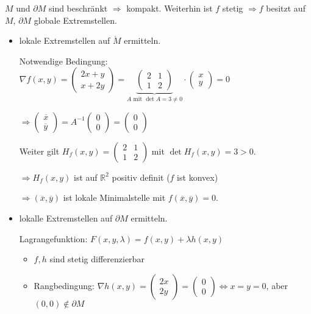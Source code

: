 \documentclass{scrreprt}
\begin{document}
$M$ und $\partial M$ sind beschränkt $\Rightarrow$ kompakt.
Weiterhin ist $f$ stetig $\Rightarrow f$ besitzt auf $M$, $\partial M$
globale Extremstellen.
\begin{itemize}
\item lokale Extremstellen auf $\mathring{M}$ ermitteln.

  Notwendige Bedingung: $\nabla f(x, y) = \begin{pmatrix}
    2x + y \\
    x + 2y
  \end{pmatrix} = \underset{A \text{ mit } \det A = 3 \ne 0}{
    \underbrace{\begin{pmatrix}
        2 & 1 \\
        1 & 2
      \end{pmatrix}}
  } \cdot \begin{pmatrix}
    x \\
    y
  \end{pmatrix} = 0$

  $\Rightarrow \begin{pmatrix}
    \overline{x} \\
    \overline{y}
  \end{pmatrix} = A^{-1} \begin{pmatrix} 0 \\ 0\end{pmatrix} =
  \begin{pmatrix} 0 \\ 0\end{pmatrix}$

  Weiter gilt $H_f (x, y) = \begin{pmatrix}
    2 & 1 \\
    1 & 2
  \end{pmatrix}$ mit $\det H_f(x, y) = 3 > 0$.

  $\Rightarrow H_f(x, y)$ ist auf $\mathbb{R}^2$ positiv definit
  ($f$ ist konvex)

  $\Rightarrow (\overline{x}, \overline{y})$ ist lokale Minimalstelle mit
  $f(\overline{x}, \overline{y}) = 0$.

\item lokalle Extremstellen auf $\partial M$ ermitteln.

  Lagrangefunktion: $F(x, y, \lambda) = f(x, y) + \lambda h(x, y)$
  \begin{itemize}
  \item $f, h$ sind stetig differenzierbar
  \item Rangbedingung: $\nabla h(x, y) = \begin{pmatrix}
      2x \\
      2y
    \end{pmatrix} = \begin{pmatrix}
      0 \\
      0
    \end{pmatrix} \iff x = y = 0$, aber $(0, 0) \notin \partial M$


\end{itemize}
\end{itemize}
\end{document}
